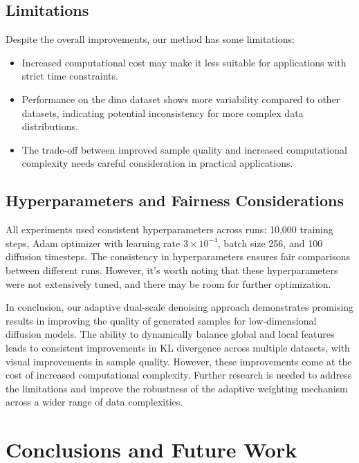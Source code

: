 \documentclass{article} %
\begin{document}
\subsection{Limitations}

Despite the overall improvements, our method has some limitations:

\begin{itemize}
    \item Increased computational cost may make it less suitable for applications with strict time constraints.
    \item Performance on the dino dataset shows more variability compared to other datasets, indicating potential inconsistency for more complex data distributions.
    \item The trade-off between improved sample quality and increased computational complexity needs careful consideration in practical applications.
\end{itemize}

\subsection{Hyperparameters and Fairness Considerations}

All experiments used consistent hyperparameters across runs: 10,000 training steps, Adam optimizer with learning rate $3 \times 10^{-4}$, batch size 256, and 100 diffusion timesteps. The consistency in hyperparameters ensures fair comparisons between different runs. However, it's worth noting that these hyperparameters were not extensively tuned, and there may be room for further optimization.

In conclusion, our adaptive dual-scale denoising approach demonstrates promising results in improving the quality of generated samples for low-dimensional diffusion models. The ability to dynamically balance global and local features leads to consistent improvements in KL divergence across multiple datasets, with visual improvements in sample quality. However, these improvements come at the cost of increased computational complexity. Further research is needed to address the limitations and improve the robustness of the adaptive weighting mechanism across a wider range of data complexities.

\section{Conclusions and Future Work}
\label{sec:conclusion}
\end{document}
